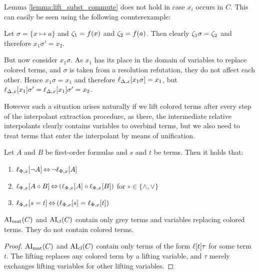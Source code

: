 \documentclass[,%
	paper=a4,%
	DIV14, %
	twoside=false,%
	liststotoc,
	bibtotoc,
	draft=false,%
	numbers=noendperiod
]{scrartcl}
\begin{document}
\begin{remark}
	Lemma \ref{lemma:lift_subst_commute} does not hold in case $x_i$ occurs in $C$.
	This can easily be seen using the following counterexample:


	Let $\sigma = \{x \mapsto a\}$ and $\colterm{1} = f(x)$ and $\colterm{2} = f(a)$. 
	Then clearly $\colterm{1}\sigma = \colterm{2}$ and therefore $x_1\sigma' = x_2$.

	But now consider $x_1 \sigma$. 
	As $x_1$ has its place in the domain of variables to replace colored terms, and $\sigma$ is taken from a resolution refutation, they do not affect each other. 
	Hence $x_1\sigma = x_1$ and therefore $\lifdelta{x_1\sigma} = x_1$, but $\lifdelta{x_1}\sigma' = \lifdelta{x_1}\sigma' = x_2$.


	However such a situation arises naturally if we lift colored terms after every step of the interpolant extraction procedure, as there, the intermediate relative interpolants clearly contains variables to overbind terms, but we also need to treat terms that enter the interpolant by means of unification.
\end{remark}

\begin{lemma}
	\label{lemma:lift_logic_commute}
	Let $A$ and $B$ be first-order formulas and $s$ and $t$ be terms. Then it holds that:
	\begin{enumerate}
		\item $\lift{\Phi}{\lnot A}{x} \semiff{} \lnot \lift{\Phi}{A}{x}$
		\item $\lift{\Phi}{A \circ B}{x} \semiff{} ( \lift{\Phi}{A}{x} \circ \lift{\Phi}{B}{x} )$ for  $\circ \in     \{\land, \lor\}$
		\item $\lift{\Phi}{s = t}{x} \semiff{} ( \lift{\Phi}{s}{x} = \lift{\Phi}{t}{x} )$
	\end{enumerate}
\end{lemma}



\begin{lemma}
	\label{lemma:no_colored_terms}
	$\AImatrix(C)$ and $\AIclause(C)$ contain only grey terms and variables replacing colored terms. They do not contain colored terms.
\end{lemma}
\begin{proof}
	$\AImatrix(C)$ and $\AIclause(C)$ contain only terms of the form $\lifboth{t}\tau$ for some term $t$.
	The lifting replaces any colored term by a lifting variable, and $\tau$ merely exchanges lifting variables for other lifting variables.
\end{proof}
\end{document}
